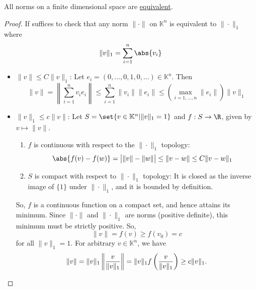\documentclass{article}
\newcommand{\K}{\mathbb{K}}
\begin{document}
\begin{prop}
    All norms on a finite dimensional space are \hyperlink{def:eqNorms}{equivalent}.
\end{prop}

\begin{proof}
    If suffices to check that any norm $\|\cdot\|$ on $\K^n$ is equivalent to $\|\cdot\|_1$ where
    \begin{equation*}
        \|v\|_1 = \sum_{i=1}^n \abs{v_i}
    \end{equation*}

    \begin{itemize}
        \item $\|v\| \leq C \|v\|_1$: Let $e_i = (0, \dotsc, 0, 1, 0, \dotsc) \in \K^n$. Then
            \begin{equation*}
            \|v\| = \left\|\sum_{i=1}^n v_i e_i\right\| \leq \sum_{i=1}^n \|v_i\| \|e_i\| \leq \left(\max_{i=1,\dotsc,n} \|e_i\|\right) \|v\|_1
            \end{equation*}

        \item $\|v\|_1 \leq c \|v\|$: Let $S = \set{v \in \K^n | \|v\|_1 = 1}$ and $f : S \to \R$, given by $v \mapsto \|v\|$.
            \begin{enumerate}
                \item $f$ is continuous with respect to the $\|\cdot\|_1$ topology:
                    \begin{equation*}
                        \abs{f(v) - f(w)} = \big|\|v\| - \|w\|\big| \leq \|v - w\| \leq C \|v-w\|_1
                    \end{equation*}
                \item $S$ is compact with respect to $\|\cdot\|_1$ topology:
                    It is closed as the inverse image of $\{1\}$ under $\|\cdot\|_1$, and it is bounded by definition.
            \end{enumerate}
            So, $f$ is a continuous function on a compact set, and hence attains its minimum.
            Since $\|\cdot\|$ and $\|\cdot\|_1$ are norms (positive definite), this minimum must be strictly positive.
            So, \begin{equation*}\|v\| = f(v) \geq f(v_0) = c\end{equation*} for all $\|v\|_1 = 1$.
            For arbitrary $v \in \K^n$, we have
            \begin{equation*}
            \|v\| = \|v\|_1 \left\|\frac{v}{\|v\|_1}\right\| = \|v\|_1 f\left(\frac{v}{\|v\|_1}\right) \geq c \|v\|_1. \qedhere
            \end{equation*}
    \end{itemize}
\end{proof}
\end{document}
